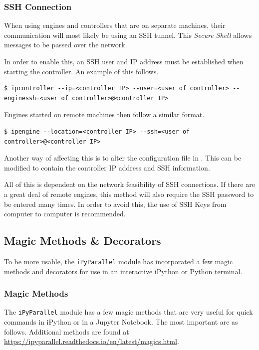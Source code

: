 \subsubsection*{SSH Connection}
When using engines and controllers that are on separate machines, their communication will most likely be using an SSH tunnel.
This \emph{Secure Shell} allows messages to be passed over the network.

In order to enable this, an SSH user and IP address must be established when starting the controller.
An example of this follows.

\begin{lstlisting}[style=ShellInput]
$ ipcontroller --ip=<controller IP> --user=<user of controller> --enginessh=<user of controller>@<controller IP>
\end{lstlisting}

Engines started on remote machines then follow a similar format.

\begin{lstlisting}[style=ShellInput]
$ ipengine --location=<controller IP> --ssh=<user of controller>@<controller IP>
\end{lstlisting}

Another way of affecting this is to alter the configuration file in .
This can be modified to contain the controller IP address and SSH information.

All of this is dependent on the network feasibility of SSH connections.
If there are a great deal of remote engines, this method will also require the SSH password to be entered many times.
In order to avoid this, the use of SSH Keys from computer to computer is recommended.


\subsection*{Magic Methods \& Decorators}
To be more usable, the \texttt{iPyParallel} module has incorporated a few magic methods and decorators for use in an interactive iPython or Python terminal.

\subsubsection*{Magic Methods}
The \texttt{iPyParallel} module has a few magic methods that are very useful for quick commands in iPython or in a Jupyter Notebook.
The most important are as follows.
Additional methods are found at \url{https://ipyparallel.readthedocs.io/en/latest/magics.html}.

